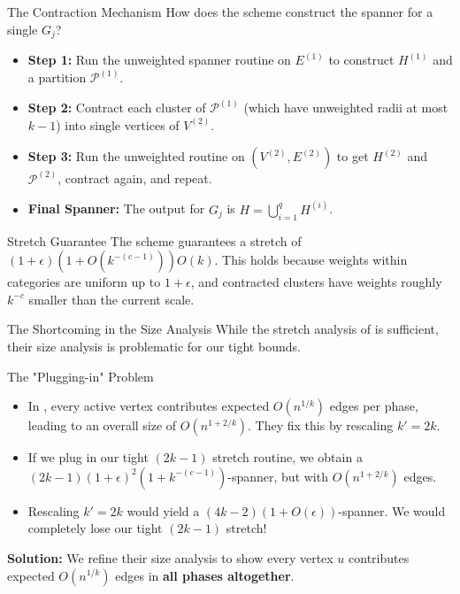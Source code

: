 \documentclass{beamer}
\begin{document}
\begin{frame}{The Contraction Mechanism}
    How does the scheme construct the spanner for a single $G_j$?
    
    \vspace{0.2cm}
    \begin{itemize}
        \item \textbf{Step 1:} Run the unweighted spanner routine on $E^{(1)}$ to construct $H^{(1)}$ and a partition $\mathcal{P}^{(1)}$.
        \item \textbf{Step 2:} Contract each cluster of $\mathcal{P}^{(1)}$ (which have unweighted radii at most $k - 1$) into single vertices of $V^{(2)}$.
        \item \textbf{Step 3:} Run the unweighted routine on $(V^{(2)}, E^{(2)})$ to get $H^{(2)}$ and $\mathcal{P}^{(2)}$, contract again, and repeat.
        \item \textbf{Final Spanner:} The output for $G_j$ is $H = \bigcup_{i=1}^q H^{(i)}$.
    \end{itemize}
    
    \vspace{0.2cm}
    \begin{block}{Stretch Guarantee}
        The scheme guarantees a stretch of $(1 + \epsilon)(1 + O(k^{-(c-1)}))O(k)$. This holds because weights within categories are uniform up to $1+\epsilon$, and contracted clusters have weights roughly $k^{-c}$ smaller than the current scale.
    \end{block}
\end{frame}

\begin{frame}{The Shortcoming in the Size Analysis}
    While the stretch analysis of \cite{MPVX15} is sufficient, their size analysis is problematic for our tight bounds.
    
    \vspace{0.2cm}
    \begin{alertblock}{The "Plugging-in" Problem}
        \begin{itemize}
            \item In \cite{MPVX15}, every active vertex contributes expected $O(n^{1/k})$ edges per phase, leading to an overall size of $O(n^{1+2/k})$. They fix this by rescaling $k' = 2k$.
            \item If we plug in our tight $(2k-1)$ stretch routine, we obtain a $(2k-1)(1+\epsilon)^2(1+k^{-(c-1)})$-spanner, but with $O(n^{1+2/k})$ edges.
            \item Rescaling $k' = 2k$ would yield a $(4k-2)(1+O(\epsilon))$-spanner. We would completely lose our tight $(2k-1)$ stretch!
        \end{itemize}
    \end{alertblock}
    
    \textbf{Solution:} We refine their size analysis to show every vertex $u$ contributes expected $O(n^{1/k})$ edges in \textbf{all phases altogether}.
\end{frame}
\end{document}
